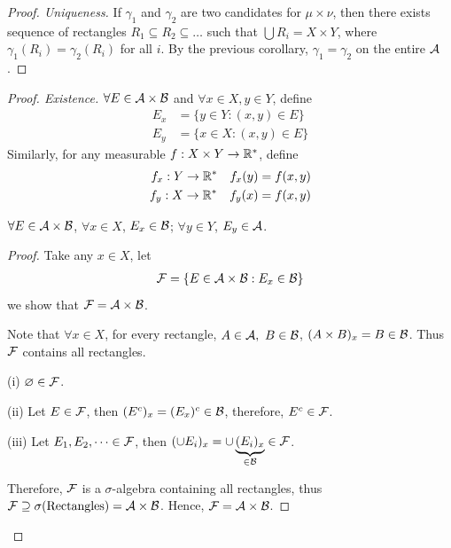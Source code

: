 \documentclass[11pt]{article}
\begin{document}
\begin{theorem}
\begin{proof}[Proof. Uniqueness]
			If $\gamma_1$ and $\gamma_2$ are two candidates for $\mu \times \nu$, then there exists sequence of rectangles $R_1 \subseteq R_2 \subseteq \dots $ such that $\bigcup R_i = X \times Y$, where $\gamma_1(R_i) = \gamma_2(R_i)$ for all $i$. By the previous corollary, $\gamma_1 = \gamma_2$ on the entire $\mathcal{{A}}$.
		\end{proof}
		\begin{proof}[Proof. Existence]
			$\forall E \in \mathcal{{A}} \times \mathcal{{B}}$ and $\forall x \in X, y \in Y$, define 
			\begin{align}
				E_x &= \{y \in Y : (x, y) \in E\} \\
				E_y &= \{x \in X : (x, y) \in E\}
			\end{align}
			Similarly, for any measurable $f: X \times Y \to \mathbb{R}^*$, define
			\begin{align}
				f_x: Y \to \mathbb{R}^*\quad f_x(y) = f(x, y) \\
				f_y: X \to \mathbb{R}^*\quad f_y(x) = f(x, y)
			\end{align}
			\begin{tcolorbox}
			\begin{lemma}
				$\forall E \in \mathcal{{A}} \times \mathcal{{B}}$, $\forall x \in X$, $E_x \in \mathcal{{B}}$; $\forall y \in Y$, $E_y \in \mathcal{{A}}$.
			\end{lemma}
			\begin{proof}
				Take any $x \in X$, let
				\begin{align}
					\mathcal{{F}} = \{E \in \mathcal{{A}} \times \mathcal{{B}} : E_x \in \mathcal{{B}} \}
				\end{align}
				we show that $\mathcal{{F}} = \mathcal{{A}} \times \mathcal{{B}}$.
				
				Note that $\forall x \in X$, for every rectangle, $A \in \mathcal{{A}},\ B \in \mathcal{{B}}$, $(A \times B)_x = B \in \mathcal{{B}}$. Thus $\mathcal{{F}}$ contains all rectangles.
				
				(i) $\varnothing \in \mathcal{{F}}$.
				
				(ii) Let $E \in \mathcal{{F}}$, then $(E^c)_x = (E_x)^c \in \mathcal{{B}}$, therefore, $E^c \in \mathcal{{F}}$.
				
				(iii) Let $E_1, E_2, \dots \in \mathcal{{F}}$, then $(\cup E_i)_x = \cup \underbrace{(E_i)_x}_{\in \mathcal{{B}}} \in \mathcal{{F}}$.
				
				Therefore, $\mathcal{{F}}$ is a $\sigma$-algebra containing all rectangles, thus $\mathcal{{F}} \supseteq \sigma(\text{{Rectangles}}) = \mathcal{{A}} \times \mathcal{{B}}$. Hence, $\mathcal{{F}} = \mathcal{{A}} \times \mathcal{{B}}$.
				

\end{proof}
\end{tcolorbox}
\end{proof}
\end{theorem}
\end{document}
